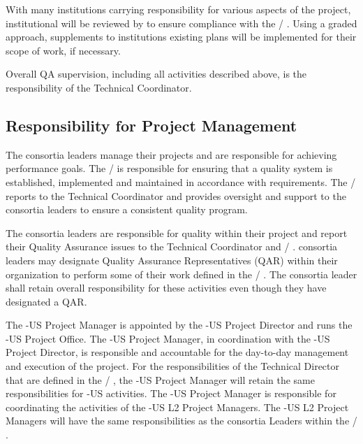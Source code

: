 With many institutions carrying responsibility for various aspects of
the project, institutional  will be reviewed by 
 to ensure compliance with the / . Using a
graded approach, supplements to institutions existing plans will be
implemented for their  scope of work, if necessary.

Overall QA supervision, including all activities described above, is
the responsibility of the  Technical Coordinator.

\subsection{Responsibility for Project Management}

The  consortia leaders manage their projects and are responsible
for achieving performance goals. The /  is responsible for
ensuring that a quality system is established, implemented and
maintained in accordance with requirements. The /  reports
to the  Technical Coordinator and provides oversight and support
to the consortia leaders to ensure a consistent quality program.

The  consortia leaders are responsible for quality within their
project and report their Quality Assurance issues to the 
Technical Coordinator and / .  consortia leaders
may designate Quality Assurance Representatives (QAR) within their
organization to perform some of their work defined in the /
. The  consortia leader shall retain overall
responsibility for these activities even though they have designated a
QAR.

The -US Project Manager is appointed by the -US Project
Director and runs the -US Project Office. The -US Project
Manager, in coordination with the -US Project Director, is
responsible and accountable for the day-to-day management and
execution of the project. For the responsibilities of the 
Technical Director that are defined in the / , the
-US Project Manager will retain the same responsibilities for
-US activities. The -US Project Manager is responsible for
coordinating the activities of the -US L2 Project Managers. The
-US L2 Project Managers will have the same responsibilities as the
 consortia Leaders within the / .

